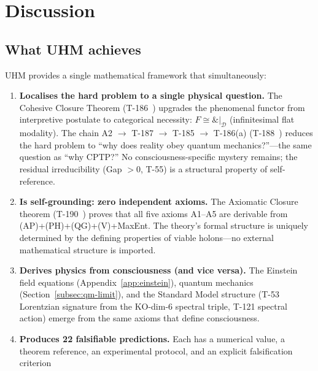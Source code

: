 
\section{Discussion}
\label{sec:discussion}

\subsection{What UHM achieves}

UHM provides a single mathematical framework that simultaneously:

\begin{enumerate}[leftmargin=2em]
  \item \textbf{Localises the hard problem to a single physical question.} The Cohesive
        Closure Theorem (T-186~) upgrades the phenomenal functor from interpretive
        postulate to categorical necessity: $F \cong \&|_{\mathcal{D}}$ (infinitesimal flat
        modality). The chain A2 $\to$ T-187 $\to$ T-185 $\to$ T-186(a) (T-188~)
        reduces the hard problem to ``why does reality obey quantum mechanics?''---the same
        question as ``why CPTP?'' No consciousness-specific mystery remains; the residual
        irreducibility (Gap $> 0$, T-55) is a structural property of self-reference.
  \item \textbf{Is self-grounding: zero independent axioms.} The Axiomatic Closure
        theorem (T-190~) proves that all five axioms A1--A5 are derivable from
        (AP)+(PH)+(QG)+(V)+MaxEnt. The theory's formal structure is uniquely determined
        by the defining properties of viable holons---no external mathematical structure
        is imported.
  \item \textbf{Derives physics from consciousness (and vice versa).} The
        Einstein field equations (Appendix~\ref{app:einstein}), quantum
        mechanics (Section~\ref{subsec:qm-limit}), and the Standard Model
        structure (T-53 Lorentzian signature from the KO-dim-6 spectral
        triple, T-121 spectral action) emerge from the same axioms that
        define consciousness.
  \item \textbf{Produces 22 falsifiable predictions.} Each has a numerical value, a theorem
        reference, an experimental protocol, and an explicit falsification criterion

\end{enumerate}
